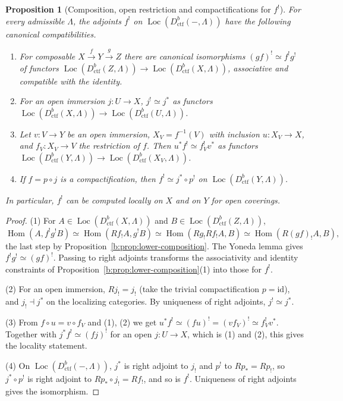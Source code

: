 \documentclass[11pt,a4paper]{article}
\numberwithin{equation}{section}
\newtheorem{proposition}[theorem]{Proposition}
\theoremstyle{definition}
\theoremstyle{remark}
\newcommand{\Loc}{\operatorname{Loc}}
\newcommand{\Hom}{\operatorname{Hom}}
\newcommand{\Dctf}{D^b_{\mathrm{ctf}}}
\begin{document}
\begin{proposition}[Composition, open restriction and compactifications for $f^!$]
\label{b:prop:composition-locality}\label{n:shriek-compactification}
For every admissible $\Lambda$, the adjoints $f^!$ on
$\Loc(\Dctf(-,\Lambda))$ have the following canonical compatibilities.
\begin{enumerate}
\item For composable $X\xrightarrow fY\xrightarrow gZ$ there are canonical
  isomorphisms $(gf)^!\simeq f^!g^!$ of functors
  $\Loc(\Dctf(Z,\Lambda))\to\Loc(\Dctf(X,\Lambda))$, associative and
  compatible with the identity.
\item For an open immersion $j:U\to X$, $j^!\simeq j^*$ as functors
  $\Loc(\Dctf(X,\Lambda))\to\Loc(\Dctf(U,\Lambda))$.
\item Let $v:V\to Y$ be an open immersion, $X_V=f^{-1}(V)$ with inclusion
  $u:X_V\to X$, and $f_V:X_V\to V$ the restriction of $f$. Then
  $u^*f^!\simeq f_V^!v^*$ as functors
  $\Loc(\Dctf(Y,\Lambda))\to\Loc(\Dctf(X_V,\Lambda))$.
\item If $f=p\circ j$ is a compactification, then $f^!\simeq j^*\circ p^!$
  on $\Loc(\Dctf(Y,\Lambda))$.
\end{enumerate}
In particular, $f^!$ can be computed locally on $X$ and on $Y$ for open
coverings.
\end{proposition}

\begin{proof}
(1) For $A\in\Loc(\Dctf(X,\Lambda))$ and $B\in\Loc(\Dctf(Z,\Lambda))$,
\[
 \Hom(A,f^!g^!B)
 \simeq\Hom(Rf_!A,g^!B)
 \simeq\Hom(Rg_!Rf_!A,B)
 \simeq\Hom(R(gf)_!A,B),
\]
the last step by Proposition~\ref{b:prop:lower-composition}. The Yoneda
lemma gives $f^!g^!\simeq(gf)^!$. Passing to right adjoints transforms
the associativity and identity constraints of
Proposition~\ref{b:prop:lower-composition}(1) into those for $f^!$.

(2) For an open immersion, $Rj_!=j_!$ (take the trivial compactification
$p=\mathrm{id}$), and $j_!\dashv j^*$ on the localizing categories. By
uniqueness of right adjoints, $j^!\simeq j^*$.

(3) From $f\circ u=v\circ f_V$ and (1), (2) we get
$u^*f^!\simeq(fu)^!=(vf_V)^!\simeq f_V^!v^*$. Together with
$j^*f^!\simeq(fj)^!$ for an open $j:U\to X$, which is (1) and (2), this
gives the locality statement.

(4) On $\Loc(\Dctf(-,\Lambda))$, $j^*$ is right adjoint to $j_!$ and $p^!$
to $Rp_*=Rp_!$, so $j^*\circ p^!$ is right adjoint to $Rp_*\circ j_!=Rf_!$,
and so is $f^!$. Uniqueness of right adjoints gives the isomorphism.
\end{proof}
\end{document}
